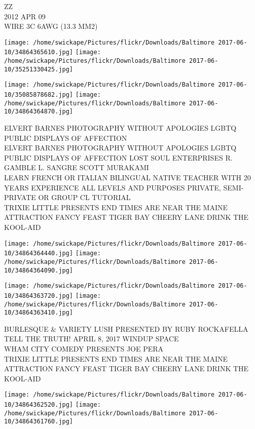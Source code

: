 \documentclass[10pt,letterpaper]{article}
\begin{document}
ZZ\\
2012 APR 09\\
WIRE 3C 6AWG (13.3 MM2)\\
\pagebreak

\texttt{[image: /home/swickape/Pictures/flickr/Downloads/Baltimore 2017-06-10/34864365610.jpg]}
\texttt{[image: /home/swickape/Pictures/flickr/Downloads/Baltimore 2017-06-10/35251330425.jpg]}

\texttt{[image: /home/swickape/Pictures/flickr/Downloads/Baltimore 2017-06-10/35085878682.jpg]}
\texttt{[image: /home/swickape/Pictures/flickr/Downloads/Baltimore 2017-06-10/34864364870.jpg]}

ELVERT BARNES PHOTOGRAPHY WITHOUT APOLOGIES LGBTQ PUBLIC DISPLAYS OF AFFECTION\\
ELVERT BARNES PHOTOGRAPHY WITHOUT APOLOGIES LGBTQ PUBLIC DISPLAYS OF AFFECTION LOST SOUL ENTERPRISES R. GAMBLE L. SANGRE SCOTT MURAKAMI\\
LEARN FRENCH OR ITALIAN BILINGUAL NATIVE TEACHER WITH 20 YEARS EXPERIENCE ALL LEVELS AND PURPOSES PRIVATE, SEMI{-}PRIVATE OR GROUP CL TUTORIAL\\
TRIXIE LITTLE PRESENTS END TIMES ARE NEAR THE MAINE ATTRACTION FANCY FEAST TIGER BAY CHEERY LANE DRINK THE KOOL{-}AID\\
\pagebreak

\texttt{[image: /home/swickape/Pictures/flickr/Downloads/Baltimore 2017-06-10/34864364440.jpg]}
\texttt{[image: /home/swickape/Pictures/flickr/Downloads/Baltimore 2017-06-10/34864364090.jpg]}

\texttt{[image: /home/swickape/Pictures/flickr/Downloads/Baltimore 2017-06-10/34864363720.jpg]}
\texttt{[image: /home/swickape/Pictures/flickr/Downloads/Baltimore 2017-06-10/34864363410.jpg]}

BURLESQUE \& VARIETY LUSH PRESENTED BY RUBY ROCKAFELLA\\
TELL THE TRUTH! APRIL 8, 2017 WINDUP SPACE\\
WHAM CITY COMEDY PRESENTS JOE PERA\\
TRIXIE LITTLE PRESENTS END TIMES ARE NEAR THE MAINE ATTRACTION FANCY FEAST TIGER BAY CHEERY LANE DRINK THE KOOL{-}AID\\
\pagebreak

\texttt{[image: /home/swickape/Pictures/flickr/Downloads/Baltimore 2017-06-10/34864362520.jpg]}
\texttt{[image: /home/swickape/Pictures/flickr/Downloads/Baltimore 2017-06-10/34864361760.jpg]}
\end{document}
